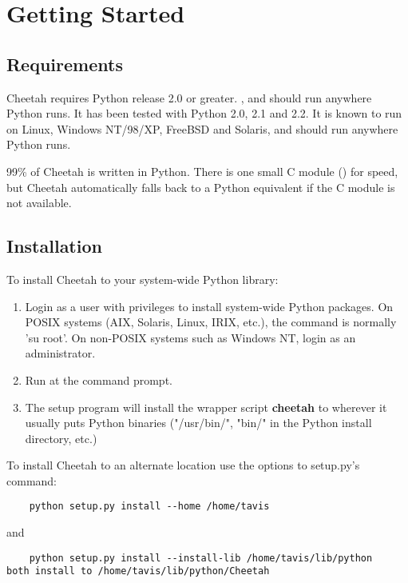 \section{Getting Started}
\label{gettingStarted}

\subsection{Requirements}
\label{gettingStarted.requirements}

Cheetah requires Python release 2.0 or greater.  , and should run anywhere
Python runs.  It has been tested with Python 2.0, 2.1 and 2.2.  It is known to
run on Linux, Windows NT/98/XP, FreeBSD and Solaris, and should run anywhere
Python runs.  

99\% of Cheetah is written in Python.  There is one small C module
() for speed, but Cheetah automatically falls back to a
Python equivalent if the C module is not available.

\subsection{Installation}
\label{gettingStarted.install}

To install Cheetah to your system-wide Python library:
\begin{enumerate}
\item Login as a user with privileges to install system-wide Python packages.
     On POSIX systems (AIX, Solaris, Linux, IRIX, etc.), the command is normally
     'su root'.  On non-POSIX systems such as Windows NT, login as an
     administrator.

\item Run  at the command prompt.

\item The setup program will install the wrapper script {\bf cheetah} to 
     wherever it usually puts Python binaries ("/usr/bin/", "bin/" in the 
     Python install directory, etc.)
\end{enumerate}


To install Cheetah to an alternate location use the options to setup.py's
 command:
\begin{verbatim}
    python setup.py install --home /home/tavis 
\end{verbatim}
and
\begin{verbatim}
    python setup.py install --install-lib /home/tavis/lib/python
both install to /home/tavis/lib/python/Cheetah
\end{verbatim}

